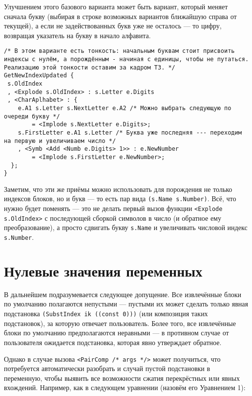 \documentclass[12pt]{article}
\begin{document}
Улучшением этого базового варианта может быть вариант, который меняет сначала букву (выбирая в строке возможных вариантов ближайшую справа от текущей), а если не задействованных букв уже не осталось --- то цифру, возвращая указатель на букву в начало алфавита.

\begin{verbatim}
/* В этом варианте есть тонкость: начальным буквам стоит присвоить индексы с нулём, а порождённым - начиная с единицы, чтобы не путаться. Реализацию этой тонкости оставим за кадром ТЗ. */
GetNewIndexUpdated {
 s.OldIndex
 , <Explode s.OldIndex> : s.Letter e.Digits
 , <CharAplhabet> : {
    e.A1 s.Letter s.NextLetter e.A2 /* Можно выбрать следующую по очереди букву */
        = <Implode s.NextLetter e.Digits>;
    s.FirstLetter e.A1 s.Letter /* Буква уже последняя --- переходим на первую и увеличиваем число */
    , <Symb <Add <Numb e.Digits> 1>> : e.NewNumber
        = <Implode s.FirstLetter e.NewNumber>;
  };
}
\end{verbatim}

Заметим, что эти же приёмы можно использовать для порождения не только индексов блоков, но и букв --- то есть пар вида \texttt{(s.Name s.Number)}. Всё, что нужно будет поменять --- это не делать первый вызов функции \texttt{<Explode s.OldIndex>} с последующей сборкой символов в число (и обратное ему преобразование), а просто сдвигать букву \texttt{s.Name} и увеличивать числовой индекс \texttt{s.Number}.
 
\section{Нулевые значения переменных}
 
В дальнейшем подразумевается следующее допущение. Все извлечённые блоки по умолчанию полагаются непустыми --- пустыми их может сделать только явная подстановка \texttt{(SubstIndex ik ((const 0)))} (или композиция таких подстановок), за которую отвечает пользователь. Более того, все извлечённые блоки по умолчанию предполагаются неравными --- в противном случае от пользователя ожидается подстановка, которая явно утверждает обратное.

Однако в случае вызова \texttt{<PairComp /* args */>} может получиться, что потребуется автоматически разобрать и случай пустой подстановки в переменную, чтобы выявить все возможности сжатия перекрёстных или явных вхождений. Например, как в следующем уравнении (назовём его Уравнением 1): 
\end{document}
